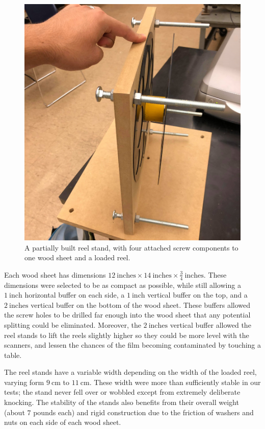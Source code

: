 \documentclass[12pt]{article} %
\begin{document}
\begin{figure}[htb]
    \centering
    \includegraphics[width=0.7\linewidth]{Images/Reel stand images/reelstadnscrewsandreel.jpg}
    \caption{A partially built reel stand, with four attached screw components to one wood sheet and a loaded reel.}
    \label{fig: reelstandscrewsandreel}
\end{figure}

Each wood sheet has dimensions $12 \ \text{inches} \times 14 \ \text{inches} \times \frac{3}{4} \ \text{inches}$. These dimensions were selected to be as compact as possible, while still allowing a $1 \ \text{inch}$ horizontal buffer on each side, a $1 \ \text{inch}$ vertical buffer on the top, and a $2 \ \text{inches}$ vertical buffer on the bottom of the wood sheet. These buffers allowed the screw holes to be drilled far enough into the wood sheet that any potential splitting could be eliminated. Moreover, the $2 \ \text{inches}$ vertical buffer allowed the reel stands to lift the reels slightly higher so they could be more level with the scanners, and lessen the chances of the film becoming contaminated by touching a table.

The reel stands have a variable width depending on the width of the loaded reel, varying form $9 \ \text{cm}$ to $11 \ \text{cm}$. These width were more than sufficiently stable in our tests; the stand never fell over or wobbled except from extremely deliberate knocking. The stability of the stands also benefits from their overall weight (about $7$ pounds each) and rigid construction due to the friction of washers and nuts on each side of each wood sheet.
\end{document}
